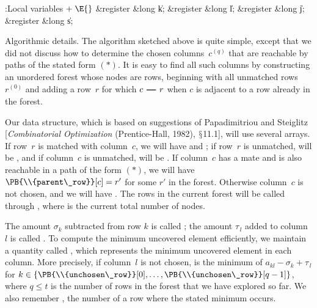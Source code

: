 \B{}:Local variables\X${}\mathrel+\E{}$\6
\&{register} \&{long} \|k;\6
\&{register} \&{long} \|l;\6
\&{register} \&{long} \|j;\6
\&{register} \&{long} \|s;\par
\fi

Algorithmic details.
The algorithm sketched above is quite simple, except that we did not
discuss how to determine the chosen columns~$c^{(q)}$ that
are reachable by paths of the stated form $(*)$. It is easy to find
all such columns by constructing an unordered forest whose nodes are rows,
beginning with all unmatched rows~$r^{(0)}$ and adding a row~$r$
for which $c\ddash r$ when $c$ is adjacent to a row already in the forest.

Our data structure, which is based on suggestions of Papadimitriou and
Steiglitz [{\sl Combinatorial Optimization\/} (Prentice-Hall, 1982),
$\mathchar"278$11.1], will use several arrays. If row~$r$ is matched
with column~$c$, we will have  and ;
if row~$r$ is unmatched,  will be , and
if column~$c$ is unmatched,  will be .
If column~$c$ has a mate and is also reachable in a path of the form $(*)$,
we will have $\PB{\\{parent\_row}}[c]=r'$ for some $r'$ in the forest.
Otherwise
column~$c$ is not chosen, and we will have . The rows
in the current forest will be called  through
, where  is the current total number
of nodes.

The amount $\sigma_k$ subtracted from row $k$ is called ;
the
amount $\tau_{\,l}$ added to column~$l$ is called . To
compute the minimum uncovered element efficiently, we maintain a
quantity called , which represents the minimum uncovered
element
in each column. More precisely, if column~$l$ is not chosen,
 is the minimum of $a_{kl}
-\sigma_k+\tau_{\,l}$ for $k\in\{\PB{\\{unchosen\_row}}[0],\ldots,\allowbreak
\PB{\\{unchosen\_row}}[q-1]\}$, where $q\le t$ is the number of rows in the
forest that we have explored so far. We also remember ,
the number of a row where the stated minimum occurs.


